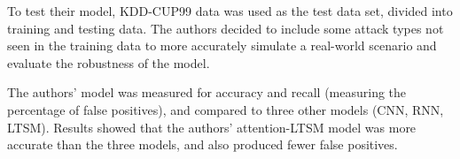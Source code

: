 To test their model, KDD-CUP99 data was used as the test data set, divided into training and testing data. The authors decided to include some attack types not seen in the training data to more accurately simulate a real-world scenario and evaluate the robustness of the model. 

The authors’ model was measured for accuracy and recall (measuring the percentage of false positives), and compared to three other models (CNN, RNN, LTSM). Results showed that the authors’ attention-LTSM model was more accurate than the three models, and also produced fewer false positives. 

